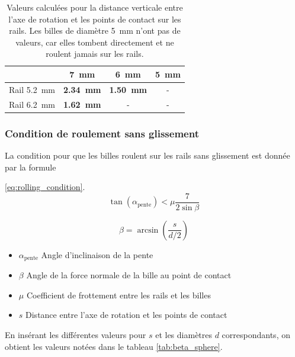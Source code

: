\begin{table}[htbp]
    \centering
    \begin{tabular}{|c|c|c|c|}
        \hline
         & \SI{7}{\mm} & \SI{6}{\mm} & \SI{5}{\mm} \\
        \hline
        Rail \SI{5.2}{\mm}& \textbf{\SI{2.34}{\mm}} & \textbf{\SI{1.50}{\mm}} & - \\
        \hline
        Rail \SI{6.2}{\mm}& \textbf{\SI{1.62}{\mm}} & - & - \\
        \hline
    \end{tabular}
    \caption{Valeurs calculées pour la distance verticale entre l'axe de rotation et les points de contact sur les rails. Les billes de diamètre \SI{5}{\mm} n'ont pas de valeurs, car elles tombent directement et ne roulent jamais sur les rails.}
    \label{tab:distance_rails}
\end{table}

\subsubsection{Condition de roulement sans glissement}
La condition pour que les billes roulent sur les rails sans glissement est donnée par la formule

\ref{eq:rolling_condition}.
\begin{equation}
    \tan(\alpha_{\text{pente}}) < \mu \frac{7}{2\sin{\beta}}
    \label{eq:rolling_condition}
\end{equation}

\[\beta = \arcsin\left(\frac{s}{d/2}\right)\]


\begin{itemize}[label={}, noitemsep]
	\item $\alpha_{\text{pente}}$ \tabto{\tabtoX} Angle d'inclinaison de la pente
	\item $\beta$ \tabto{\tabtoX} Angle de la force normale de la bille au point de contact
	\item $\mu$ \tabto{\tabtoX} Coefficient de frottement entre les rails et les billes
	\item $s$ \tabto{\tabtoX} Distance entre l'axe de rotation et les points de contact
\end{itemize}

En insérant les différentes valeurs pour $s$ et les diamètres $d$ correspondants, on obtient les valeurs notées dans le tableau \ref{tab:beta_sphere}.

